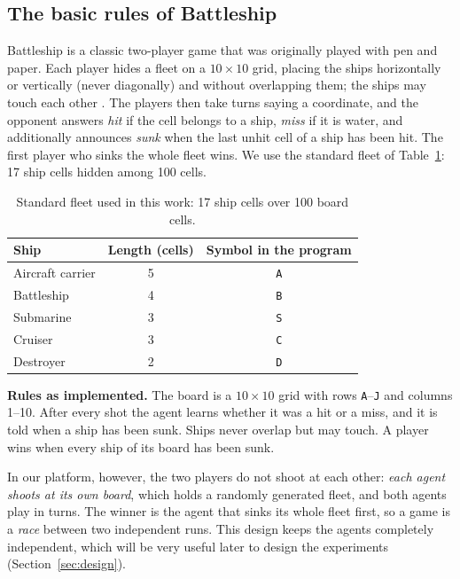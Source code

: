 \documentclass[letterpaper,11pt]{article} %
\renewcommand{\arraystretch}{1.8}
\begin{document}
\subsection{The basic rules of Battleship}

Battleship is a classic two-player game that was originally played with pen and paper.
Each player hides a fleet on a $10\times10$ grid, placing the ships horizontally or vertically (never diagonally) and without overlapping them; the ships may touch each other \cite{berry2011}.
The players then take turns saying a coordinate, and the opponent answers \emph{hit} if the cell belongs to a ship, \emph{miss} if it is water, and additionally announces \emph{sunk} when the last unhit cell of a ship has been hit.
The first player who sinks the whole fleet wins.
We use the standard fleet of Table~\ref{tab:fleet}: 17 ship cells hidden among 100 cells.

\begin{table}[H]
    \centering
    \renewcommand{\arraystretch}{1.4}
    \begin{tabular}{|l|c|c|}
        \hline
        \rowcolor{blue!20}
        Ship & Length (cells) & Symbol in the program \\ \hline
        Aircraft carrier & 5 & \texttt{A} \\ \hline
        Battleship & 4 & \texttt{B} \\ \hline
        Submarine & 3 & \texttt{S} \\ \hline
        Cruiser & 3 & \texttt{C} \\ \hline
        Destroyer & 2 & \texttt{D} \\ \hline
    \end{tabular}
    \caption{Standard fleet used in this work: 17 ship cells over 100 board cells.}
    \label{tab:fleet}
\end{table}

\begin{IOFrame}
\textbf{Rules as implemented.} The board is a $10\times10$ grid with rows \texttt{A}--\texttt{J} and columns 1--10. After every shot the agent learns whether it was a hit or a miss, and it is told when a ship has been sunk. Ships never overlap but may touch. A player wins when every ship of its board has been sunk.
\end{IOFrame}

In our platform, however, the two players do not shoot at each other: \emph{each agent shoots at its own board}, which holds a randomly generated fleet, and both agents play in turns.
The winner is the agent that sinks its whole fleet first, so a game is a \emph{race} between two independent runs.
This design keeps the agents completely independent, which will be very useful later to design the experiments (Section~\ref{sec:design}).
\end{document}
